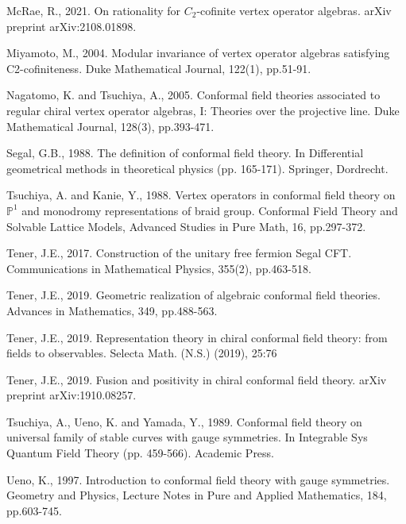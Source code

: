 \documentclass[12pt,a4paper,notitlepage]{article}
\theoremstyle{definition}
\theoremstyle{plain}
\newcommand{\Pbb}{\mathbb P}
\numberwithin{equation}{section}
\begin{document}
\begin{thebibliography}{999999}
McRae, R., 2021. On rationality for $C_2$-cofinite vertex operator algebras. arXiv preprint arXiv:2108.01898.

Miyamoto, M., 2004. Modular invariance of vertex operator algebras satisfying C2-cofiniteness. Duke Mathematical Journal, 122(1), pp.51-91.


Nagatomo, K. and Tsuchiya, A., 2005. Conformal field theories associated to regular chiral vertex operator algebras, I: Theories over the projective line. Duke Mathematical Journal, 128(3), pp.393-471.

Segal, G.B., 1988. The definition of conformal field theory. In Differential geometrical methods in theoretical physics (pp. 165-171). Springer, Dordrecht.

Tsuchiya, A. and Kanie, Y., 1988. Vertex operators in conformal field theory on $\Pbb^1$ and monodromy representations of braid group. Conformal Field Theory and Solvable Lattice Models, Advanced Studies in Pure Math, 16, pp.297-372.

Tener, J.E., 2017. Construction of the unitary free fermion Segal CFT. Communications in Mathematical Physics, 355(2), pp.463-518.



Tener, J.E., 2019. Geometric realization of algebraic conformal field theories. Advances in Mathematics, 349, pp.488-563.


Tener, J.E., 2019. Representation theory in chiral conformal field theory: from fields to
observables. Selecta Math. (N.S.) (2019), 25:76

Tener, J.E., 2019. Fusion and positivity in chiral conformal field theory. arXiv preprint arXiv:1910.08257.
		

Tsuchiya, A., Ueno, K. and Yamada, Y., 1989. Conformal field theory on universal family of stable curves with gauge symmetries. In Integrable Sys Quantum Field Theory (pp. 459-566). Academic Press.
	
Ueno, K., 1997. Introduction to conformal field theory with gauge symmetries. Geometry and Physics, Lecture Notes in Pure and Applied Mathematics, 184, pp.603-745.

		


\end{thebibliography}
\end{document}
